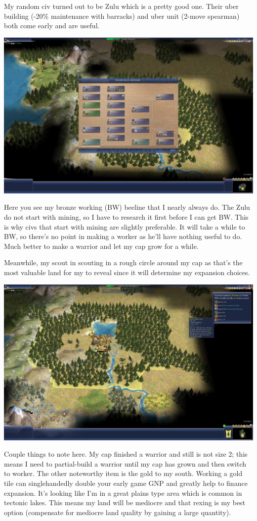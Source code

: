 \documentclass[10pt]{article}
\begin{document}
My random civ turned out to be Zulu which is a pretty good one. Their uber building
(-20\% maintenance with barracks) and uber unit (2-move spearman) both come early
and are useful.

\includegraphics[width=1.0\textwidth]{2}

Here you see my bronze working (BW) beeline that I nearly always do. The Zulu do not start
with mining, so I have to research it first before I can get BW. This is why civs that start
with mining are slightly preferable. It will take a while to BW, so there's no point in making
a worker as he'll have nothing useful to do. Much better to make a warrior and let my cap grow
for a while.

Meanwhile, my scout in scouting in a rough circle around my cap as that's the most valuable
land for my to reveal since it will determine my expansion choices.

\includegraphics[width=1.0\textwidth]{3}

Couple things to note here. My cap finished a warrior and still is not size 2; this means I need
to partial-build a warrior until my cap has grown and then switch to worker. The other noteworthy
item is the gold to my south. Working a gold tile can singlehandedly double your early game GNP
and greatly help to finance expansion. It's looking like I'm in a great plains type area which is
common in tectonic lakes. This means my land will be mediocre and that rexing is my best option
(compensate for mediocre land quality by gaining a large quantity).
\end{document}
